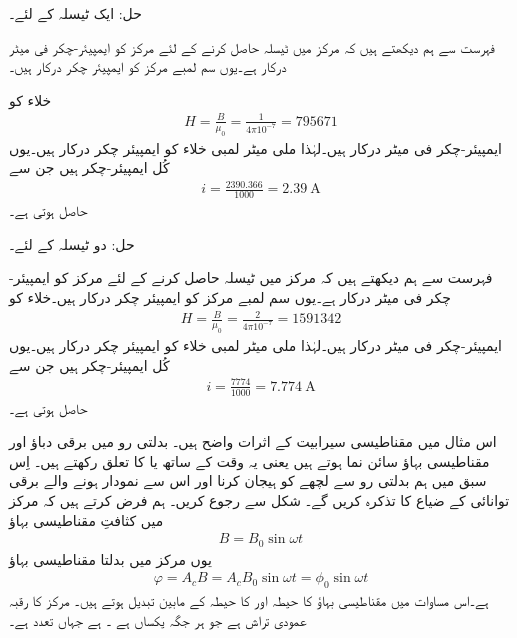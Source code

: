 حل: ایک ٹیسلہ کے لئے۔

 فہرست  سے ہم دیکھتے ہیں کہ مرکز میں  ٹیسلہ  حاصل کرنے کے لئے  مرکز کو   ایمپیئر-چکر فی  میٹر  درکار ہے۔یوں  سم لمبے مرکز کو   ایمپیئر چکر درکار ہیں۔

خلاء کو
\begin{align*}
H=\frac{B}{\mu_0}=\frac{1}{4\pi 10^{-7}}=\num{795671}
\end{align*}
ایمپیئر-چکر فی میٹر درکار ہیں۔لہٰذا  ملی میٹر لمبی خلاء کو  ایمپیئر چکر درکار ہیں۔یوں کُل ایمپیئر-چکر  ہیں جن سے 
\begin{align*}
i=\frac{2390.366}{1000}=\SI{2.39}{\ampere}
\end{align*}	
حاصل ہوتی ہے۔

حل: دو ٹیسلہ کے لئے۔

فہرست سے ہم دیکھتے ہیں کہ مرکز میں  ٹیسلہ  حاصل کرنے کے لئے  مرکز کو  ایمپیئر-چکر فی میٹر  درکار ہے۔یوں  سم لمبے مرکز کو  ایمپیئر چکر درکار ہیں۔خلاء کو
\begin{align*}
H=\frac{B}{\mu_0}=\frac{2}{4\pi 10^{-7}}=\num{1591342}
\end{align*}
ایمپیئر-چکر فی میٹر درکار ہیں۔لہٰذا  ملی میٹر لمبی خلاء کو    ایمپیئر چکر درکار ہیں۔یوں کُل ایمپیئر-چکر 	ہیں جن سے 
\begin{align*}
i=\frac{7774}{1000}=\SI{7.774}{\ampere}
\end{align*}
حاصل ہوتی ہے۔

اس مثال میں مقناطیسی سیرابیت کے اثرات واضح ہیں۔ 
%
بدلتی رو میں برقی دباؤ اور مقناطیسی بہاؤ سائن نما ہوتے ہیں یعنی یہ وقت کے ساتھ  یا  کا تعلق رکھتے ہیں۔ اِس سبق میں ہم بدلتی رو سے لچھے کو ہیجان کرنا اور اس سے نمودار ہونے والے برقی توانائی  کے ضیاع  کا تذکرہ  کریں گے۔ شکل  سے رجوع کریں۔ ہم فرض کرتے ہیں کہ مرکز میں کثافتِ مقناطیسی بہاؤ 
\begin{align}
B=B_0 \sin \omega t
\end{align}
یوں مرکز میں بدلتا مقناطیسی بہاؤ 
\begin{align}
\varphi=A_c B=A_c B_0 \sin \omega t=\phi_0 \sin \omega t
\end{align}
ہے۔اس مساوات میں مقناطیسی بہاؤ کا حیطہ   اور  کا حیطہ  کے مابین تبدیل ہوتے ہیں۔ مرکز کا رقبہ عمودی تراش ہے جو ہر جگہ یکساں ہے ۔ ہے جہاں  تعدد ہے۔

